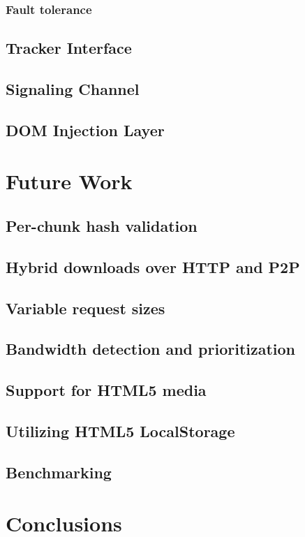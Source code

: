 \documentclass[letterpaper,twocolumn,10pt]{article}
\begin{document}
\subsubsection{Fault tolerance}


\subsection{Tracker Interface}

\subsection{Signaling Channel}

\subsection{DOM Injection Layer}


\section{Future Work}
\subsection*{Per-chunk hash validation}


\subsection*{Hybrid downloads over HTTP and P2P}


\subsection*{Variable request sizes}


\subsection*{Bandwidth detection and prioritization}


\subsection*{Support for HTML5 media}

\subsection*{Utilizing HTML5 LocalStorage}

\subsection*{Benchmarking}


\section{Conclusions}


{\footnotesize 
}
\end{document}
